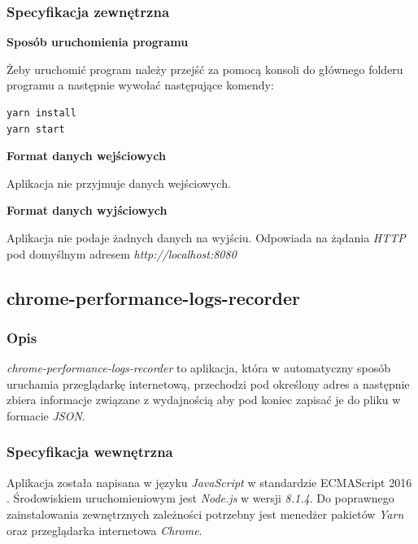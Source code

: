 \documentclass[polish, twoside, 12pt]{mwart}
\begin{document}
\subsubsection{Specyfikacja zewnętrzna}

\textbf{Sposób uruchomienia programu} \newline

Żeby uruchomić program należy przejść za pomocą konsoli do głównego folderu programu a następnie wywołać następujące komendy:

\begin{lstlisting}
yarn install
yarn start
\end{lstlisting}

\textbf{Format danych wejściowych} \newline

Aplikacja nie przyjmuje danych wejściowych. \newline

\textbf{Format danych wyjściowych} \newline

Aplikacja nie podaje żadnych danych na wyjściu. Odpowiada na żądania \emph{HTTP} pod domyślnym adresem \emph{http://localhost:8080}

\subsection{chrome-performance-logs-recorder}

\subsubsection{Opis}

\emph{chrome-performance-logs-recorder} to aplikacja, która w automatyczny sposób uruchamia przeglądarkę internetową, przechodzi pod określony adres a następnie zbiera informacje związane z wydajnością aby pod koniec zapisać je do pliku w formacie \emph{JSON}. 

\subsubsection{Specyfikacja wewnętrzna}

Aplikacja została napisana w języku \emph{JavaScript} w standardzie ECMAScript 2016 \cite{es2016}. Środowiskiem uruchomieniowym jest \emph{Node.js} \cite{node.js} w wersji \emph{8.1.4}. Do poprawnego zainstalowania zewnętrznych zależności potrzebny jest menedżer pakietów \emph{Yarn} \cite{yarn} oraz przeglądarka internetowa \emph{Chrome}.
\end{document}
